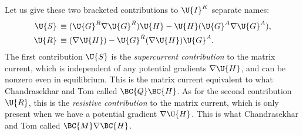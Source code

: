 Let us give these two bracketed contributions to $\U{I}^K$ separate names:
\begin{align}
  \U{S}\, &\equiv (\U{G}^R \nabla \U{G}^R) \U{H} - \U{H} (\U{G}^A \nabla \U{G}^A),  \\
  \U{R}\, &\equiv (\nabla\U{H}) - \U{G}^R (\nabla\U{H}) \U{G}^A.
\end{align}
The first contribution $\U{S}$ is the \emph{supercurrent contribution} to the matrix current, which is independent of any potential gradients $\nabla\U{H}$, and can be nonzero even in equilibrium.
This is the matrix current equivalent to what Chandrasekhar and Tom called $\BC{Q}\BC{H}$.
As for the second contribution $\U{R}$, this is the \emph{resistive contribution} to the matrix current, which is only present when we have a potential gradient $\nabla\U{H}$.
This is what Chandrasekhar and Tom called $\BC{M}\nabla\BC{H}$.

\clearpage
